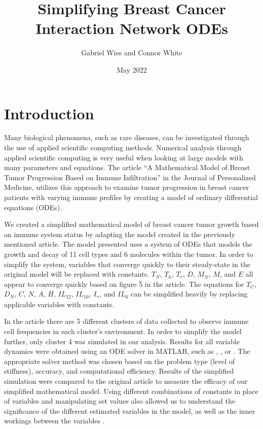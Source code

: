 \documentclass{article}
\title{Simplifying Breast Cancer Interaction Network ODEs}
\author{Gabriel Wies and Connor White}
\date{May 2022}
\begin{document}
\maketitle

\section{Introduction}
Many biological phenomena, such as rare diseases, can be investigated through the use of applied scientific computing methods. Numerical analysis through applied scientific computing is very useful when looking at large models with many parameters and equations. The article “A Mathematical Model of Breast Tumor Progression Based on Immune Infiltration” in the Journal of Personalized Medicine, utilizes this approach to examine tumor progression in breast cancer patients with varying immune profiles by creating a model of ordinary differential equations (ODEs).

We created a simplified mathematical model of breast cancer tumor growth based on immune system status by adapting the model created in the previously mentioned article. The model presented uses a system of ODEs that models the growth and decay of 11 cell types and 6 molecules within the tumor. In order to simplify the system, variables that converge quickly to their steady-state in the original model will be replaced with constants. $T_N$, $T_h$, $T_r$, $D$, $M_N$, $M$, and $E$ all appear to converge quickly based on figure 5 in the article. The equations for $T_C$, $D_N$, $C$, $N$, $A$, $H$, $IL_{12}$, $IL_{10}$, $I_{\gamma}$, and $IL_6$ can be simplified heavily by replacing applicable variables with constants.

In the article there are 5 different clusters of data collected to observe immune cell frequencies in each cluster’s environment. In order to simplify the model further, only cluster 4 was simulated in our analysis. Results for all variable dynamics were obtained using an ODE solver in MATLAB, such as , , or . The appropriate solver method was chosen based on the problem type (level of stiffness), accuracy, and computational efficiency. Results of the simplified simulation were compared to the original article to measure the efficacy of our simplified mathematical model. Using different combinations of constants in place of variables and manipulating set values also allowed us to understand the significance of the different estimated variables in the model, as well as the inner workings between the variables \cite[]{jpm11101031}.
\end{document}
